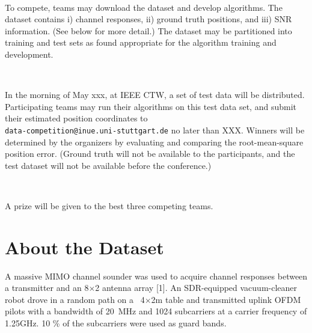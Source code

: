 \documentclass[letter]{moderncv} %
\begin{document}
~

To compete, teams may download the dataset and develop algorithms. The dataset contains i) channel responses, ii) ground truth positions, and iii) SNR information. (See below for more detail.)
The dataset may be partitioned into training and test sets as found appropriate for
the algorithm training and development.

~

In the morning of May xxx, at IEEE CTW, a set of test data will be distributed. Participating teams may run their algorithms on this test data set, and submit their
estimated position coordinates to  \\
\texttt{data-competition@inue.uni-stuttgart.de} no later than XXX.
Winners will be determined by the organizers by evaluating and comparing the root-mean-square position error. (Ground truth will not be available to the
participants, and the test dataset will not be available before the conference.)

~

A prize will be given to the best three competing teams.


\section{About the Dataset}

A massive MIMO channel sounder was used to acquire channel responses between a transmitter and an 8$\times$2 antenna array [1]. An SDR-equipped vacuum-cleaner robot drove in a random path on a ~4$\times$2m table and transmitted uplink OFDM pilots with a bandwidth of 20~MHz and 1024 subcarriers at a carrier frequency of 1.25GHz. 10 \% of the subcarriers were used as guard bands.
\vspace{2ex}
\end{document}
